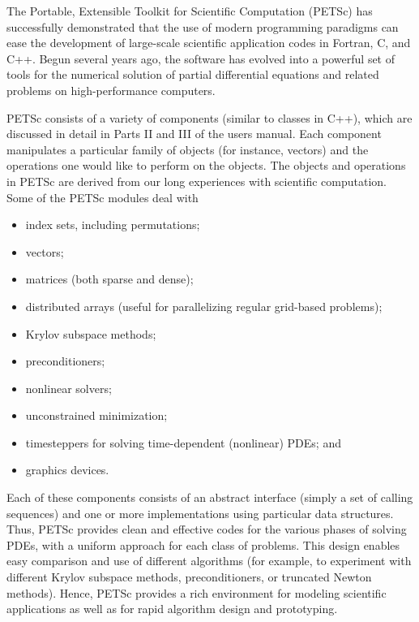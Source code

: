 
%
%
%

The Portable, Extensible Toolkit for Scientific Computation (PETSc)
has successfully demonstrated that the use of modern programming
paradigms can ease the development of large-scale scientific
application codes in Fortran, C, and C++.  Begun several years ago,
the software has evolved into a powerful set of tools for the
numerical solution of partial differential equations and related problems 
on high-performance computers.

PETSc consists of a variety of components (similar to classes in C++),
which are discussed in detail in Parts II and III of the users manual.
Each component manipulates a particular family of objects (for instance,
vectors) and the operations one would like to perform on the objects.
The objects and operations in PETSc are derived from our long 
experiences with scientific computation. Some of the PETSc modules deal with 
\begin{itemize} 
\item index sets, including permutations;
\item vectors;
\item matrices (both sparse and dense);
\item distributed arrays (useful for parallelizing regular grid-based 
      problems);
\item Krylov subspace methods;
\item preconditioners;
\item nonlinear solvers;
\item unconstrained minimization;
\item timesteppers for solving time-dependent (nonlinear) PDEs; and
\item graphics devices.
\end{itemize}
Each of these components consists of an abstract interface 
(simply a set of calling sequences) and one or more implementations 
using particular data structures. Thus, PETSc provides clean and 
effective codes for the various phases of solving PDEs, with a uniform 
approach for each class of problems.  This design
enables easy comparison and use of different algorithms (for example,
to experiment with different Krylov subspace methods, preconditioners,
or truncated Newton methods).
Hence, PETSc provides a rich environment for modeling scientific
applications as well as for rapid algorithm design and prototyping.

